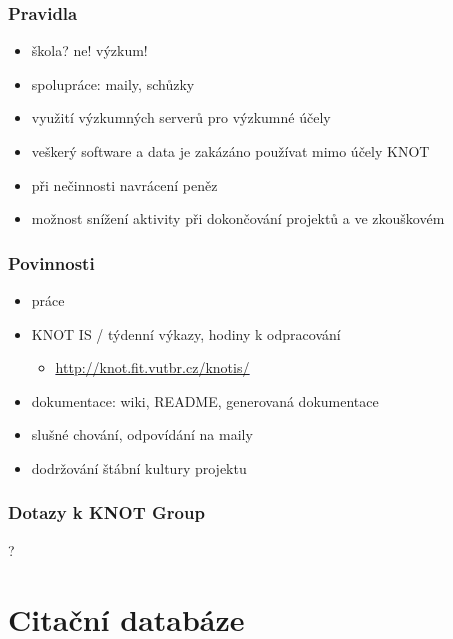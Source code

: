 \documentclass{beamer}
\begin{document}
\begin{frame}
  \frametitle{Pravidla}
  \begin{itemize}
    \item škola? ne! výzkum!
    \item spolupráce: maily, schůzky
    \item využití výzkumných serverů pro výzkumné účely
    \item veškerý software a data je zakázáno používat mimo účely KNOT
    \item při nečinnosti navrácení peněz
    \item možnost snížení aktivity při dokončování projektů a ve zkouškovém
  \end{itemize}
\end{frame}

\begin{frame}
  \frametitle{Povinnosti}
  \begin{itemize}
    \item {\alert{práce}}
    \item KNOT IS / týdenní výkazy, hodiny k odpracování
      \begin{itemize}
        \item \textcolor{blue}{\underline{\href{http://knot.fit.vutbr.cz/knotis/}{http://knot.fit.vutbr.cz/knotis/}}}
      \end{itemize}
    \item dokumentace: wiki, README, generovaná dokumentace
    \item slušné chování, odpovídání na maily
    \item dodržování štábní kultury projektu
  \end{itemize}
\end{frame}

\begin{frame}
  \frametitle{Dotazy k KNOT Group}
  { ? }
\end{frame}



\section{Cita{\v{c}}n\'{i} databáze}
\end{document}
